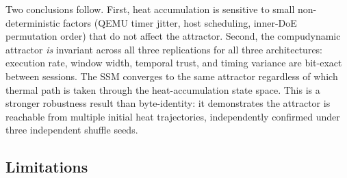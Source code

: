 \documentclass[10pt,a4paper]{article}
\begin{document}
Two conclusions follow.  First, heat accumulation is sensitive to small
non-deterministic factors (QEMU timer jitter, host scheduling, inner-DoE
permutation order) that do not affect the attractor.  Second, the compudynamic
attractor \emph{is} invariant across all three replications for all three
architectures: execution rate, window width, temporal trust, and timing variance
are bit-exact between sessions.  The SSM converges to the same attractor
regardless of which thermal path is taken through the heat-accumulation state
space.  This is a stronger robustness result than byte-identity: it demonstrates
the attractor is reachable from multiple initial heat trajectories, independently
confirmed under three independent shuffle seeds.

\subsection{Limitations}
\label{sec:disc_independence}
\end{document}
